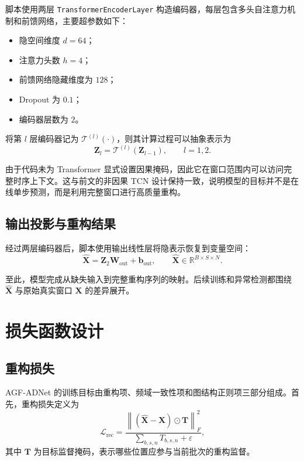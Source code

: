 脚本使用两层 \texttt{TransformerEncoderLayer} 构造编码器，每层包含多头自注意力机制和前馈网络，主要超参数如下：
\begin{itemize}
    \item 隐空间维度 $d=64$；
    \item 注意力头数 $h=4$；
    \item 前馈网络隐藏维度为 $128$；
    \item Dropout 为 $0.1$；
    \item 编码器层数为 $2$。
\end{itemize}

将第 $l$ 层编码器记为 $\mathcal{T}^{(l)}(\cdot)$，则其计算过程可以抽象表示为
\begin{equation}
    \mathbf{Z}_l = \mathcal{T}^{(l)}(\mathbf{Z}_{l-1}), \qquad l=1,2.
\end{equation}

由于代码未为 Transformer 显式设置因果掩码，因此它在窗口范围内可以访问完整时序上下文。这与前文的非因果 TCN 设计保持一致，说明模型的目标并不是在线单步预测，而是利用完整窗口进行高质量重构。

\subsection{输出投影与重构结果}

经过两层编码器后，脚本使用输出线性层将隐表示恢复到变量空间：
\begin{equation}
    \hat{\mathbf{X}} = \mathbf{Z}_2 \mathbf{W}_{\mathrm{out}} + \mathbf{b}_{\mathrm{out}},
    \qquad
    \hat{\mathbf{X}} \in \mathbb{R}^{B \times S \times N}.
\end{equation}

至此，模型完成从缺失输入到完整重构序列的映射。后续训练和异常检测都围绕 $\hat{\mathbf{X}}$ 与原始真实窗口 $\mathbf{X}$ 的差异展开。

\section{损失函数设计}

\subsection{重构损失}

AGF-ADNet 的训练目标由重构项、频域一致性项和图结构正则项三部分组成。首先，重构损失定义为
\begin{equation}
    \mathcal{L}_{\mathrm{rec}}
    =
    \frac{
        \left\|
            (\hat{\mathbf{X}} - \mathbf{X}) \odot \mathbf{T}
        \right\|_F^2
    }{
        \sum_{b,s,n} T_{b,s,n} + \varepsilon
    },
\end{equation}
其中 $\mathbf{T}$ 为目标监督掩码，表示哪些位置应参与当前批次的重构监督。

